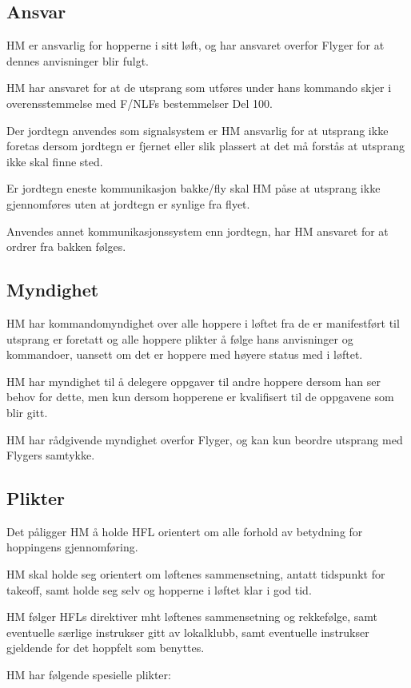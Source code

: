 \subsection{Ansvar}
HM er ansvarlig for hopperne i sitt løft, og har ansvaret overfor Flyger for at dennes anvisninger blir fulgt.

HM har ansvaret for at de utsprang som utføres under hans kommando skjer i overensstemmelse med F/NLFs bestemmelser Del 100.

Der jordtegn anvendes som signalsystem er HM ansvarlig for at utsprang ikke foretas dersom jordtegn er fjernet eller slik plassert at det må forstås at utsprang ikke skal finne sted.

Er jordtegn eneste kommunikasjon bakke/fly skal HM påse at utsprang ikke gjennomføres uten at jordtegn er synlige fra flyet.

Anvendes annet kommunikasjonssystem enn jordtegn, har HM ansvaret for at ordrer fra bakken følges.

\subsection{Myndighet}
HM har kommandomyndighet over alle hoppere i løftet fra de er manifestført til utsprang er foretatt og alle hoppere plikter å følge hans anvisninger og kommandoer, uansett om det er hoppere med høyere status med i løftet.

HM har myndighet til å delegere oppgaver til andre hoppere dersom han ser behov for dette, men kun dersom hopperene er kvalifisert til de oppgavene som blir gitt.

HM har rådgivende myndighet overfor Flyger, og kan kun beordre utsprang med Flygers samtykke.

\subsection{Plikter}
Det påligger HM å holde HFL orientert om alle forhold av betydning for hoppingens gjennomføring.

HM skal holde seg orientert om løftenes sammensetning, antatt tidspunkt for takeoff, samt holde seg selv og hopperne i løftet klar i god tid.

HM følger HFLs direktiver mht løftenes sammensetning og rekkefølge, samt eventuelle særlige instrukser gitt av lokalklubb, samt eventuelle instrukser gjeldende for det hoppfelt som benyttes.

HM har følgende spesielle plikter:

